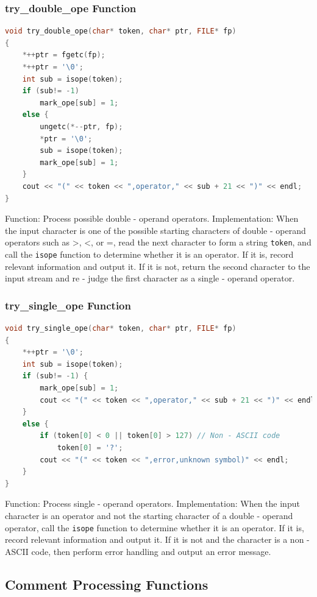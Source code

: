 \documentclass[a4paper,12pt]{article}
\begin{document}
        \subsubsection{try\_double\_ope Function}
        \begin{lstlisting}[language=c++]
void try_double_ope(char* token, char* ptr, FILE* fp)
{
    *++ptr = fgetc(fp);
    *++ptr = '\0';
    int sub = isope(token);
    if (sub!= -1)
        mark_ope[sub] = 1;
    else {
        ungetc(*--ptr, fp);
        *ptr = '\0';
        sub = isope(token);
        mark_ope[sub] = 1;
    }
    cout << "(" << token << ",operator," << sub + 21 << ")" << endl;
}
        \end{lstlisting}
        Function: Process possible double - operand operators.
        Implementation: When the input character is one of the possible starting characters of double - operand operators such as >, <, or =, read the next character to form a string \texttt{token}, and call the \texttt{isope} function to determine whether it is an operator. If it is, record relevant information and output it. If it is not, return the second character to the input stream and re - judge the first character as a single - operand operator.
        
        \subsubsection{try\_single\_ope Function}
        \begin{lstlisting}[language=c++]
void try_single_ope(char* token, char* ptr, FILE* fp)
{
    *++ptr = '\0';
    int sub = isope(token);
    if (sub!= -1) {
        mark_ope[sub] = 1;
        cout << "(" << token << ",operator," << sub + 21 << ")" << endl;
    }
    else {
        if (token[0] < 0 || token[0] > 127) // Non - ASCII code
            token[0] = '?';
        cout << "(" << token << ",error,unknown symbol)" << endl;
    }
}
        \end{lstlisting}
        Function: Process single - operand operators.
        Implementation: When the input character is an operator and not the starting character of a double - operand operator, call the \texttt{isope} function to determine whether it is an operator. If it is, record relevant information and output it. If it is not and the character is a non - ASCII code, then perform error handling and output an error message.
        
\subsection{Comment Processing Functions}
\end{document}
